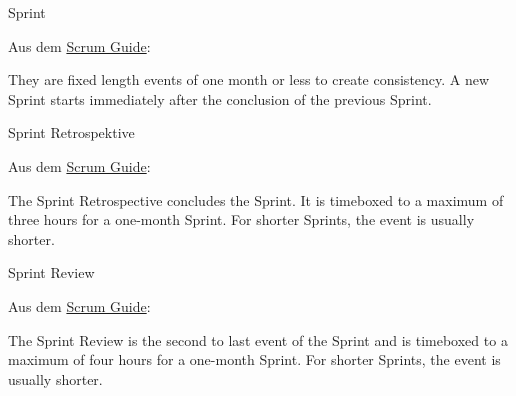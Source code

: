 \documentclass{abgabe}
\begin{document}
\begin{questions}
\begin{parts}
\begin{subparts}
            \subpart 
            Sprint
            \begin{solution}
                Aus dem \href{https://scrumguides.org/scrum-guide.html#sprint-planning}{Scrum Guide}:
                \begin{displayquote}
                    They are fixed length events of one month or less to create consistency. 
                    A new Sprint starts immediately after the conclusion of the previous Sprint.
                \end{displayquote}
            \end{solution}
            
            \newpage 
            \subpart 
            Sprint Retrospektive
            \begin{solution}
                Aus dem \href{https://scrumguides.org/scrum-guide.html#sprint-planning}{Scrum Guide}:
                \begin{displayquote}
                    The Sprint Retrospective concludes the Sprint. 
                    It is timeboxed to a maximum of three hours for a one-month Sprint. 
                    For shorter Sprints, the event is usually shorter.
                \end{displayquote}
            \end{solution}
            
            \subpart 
            Sprint Review
            \begin{solution}
                Aus dem \href{https://scrumguides.org/scrum-guide.html#sprint-planning}{Scrum Guide}:
                \begin{displayquote}
                    The Sprint Review is the second to last event of the Sprint and is timeboxed to a maximum of four hours for a one-month Sprint. 
                    For shorter Sprints, the event is usually shorter.
                \end{displayquote}
            \end{solution}
        \end{subparts}
        

\end{parts}
\end{questions}
\end{document}
